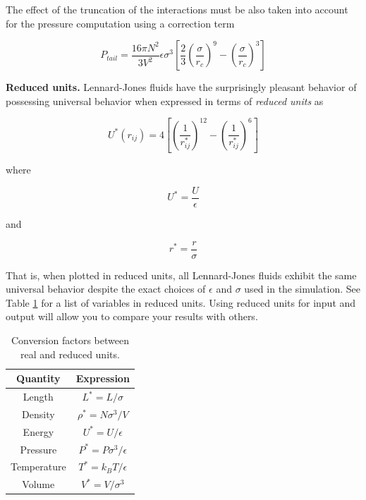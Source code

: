 \documentclass[aip,jcp,preprint,superscriptaddress,floatfix]{revtex4-1}
\begin{document}
The effect of the truncation of the interactions must be also taken into account for the pressure
computation using a correction term

\begin{equation}
        P_{tail} = \frac{16 \pi N^2}{3 V^2} \epsilon \sigma^3
        \left[\frac{2}{3} \left(\frac{\sigma}{r_c} \right)^9 
        - \left(\frac{\sigma}{r_c} \right)^3 \right]
\end{equation}




\textbf{Reduced units.}
Lennard-Jones fluids have the surprisingly pleasant behavior of possessing universal behavior when expressed in terms of \emph{reduced units} as

\begin{equation}
	U^*\left(r_{ij} \right) = 4 \left[\left(\frac{1}{r^*_{ij}}\right)^{12} -\left(\frac{1}{r^*_{ij}}\right)^{6} \right]
\end{equation}

where 

\begin{equation}
	U^* = \frac{U}{\epsilon}
\end{equation}

and 

\begin{equation}
	r^* = \frac{r}{\sigma}
\end{equation}

That is, when plotted in reduced units, all Lennard-Jones fluids exhibit the same universal behavior despite the exact choices of $\epsilon$ and $\sigma$ used in the simulation. See Table \ref{table:reducedUnits} for a list
of variables in reduced units.
Using reduced units for input and output will allow you to compare your results with others.

\begin{table}[t]
\centering
 \begin{tabular}{|c c|} 
 \hline
 Quantity & Expression \\ [0.5ex] 
 \hline\hline
 Length &  $L^*=L / \sigma$   \\ 
 Density &  $\rho^* = N \sigma^3 / V$   \\
 Energy &  $U^* = U / \epsilon$   \\
 Pressure &  $P^* = P \sigma^3 / \epsilon$   \\
 Temperature & $T^* = k_B T / \epsilon$ \\
 Volume & $V^* = V / \sigma^3$ \\
 \hline
 \end{tabular}
 \caption{Conversion factors between real and reduced units.}
 \label{table:reducedUnits}
\end{table}
\end{document}
